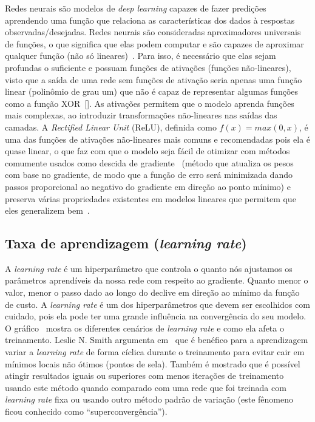 Redes neurais são modelos de \textit{deep learning} capazes de fazer predições aprendendo uma função que relaciona as características dos dados à respostas observadas/desejadas. Redes neurais são consideradas aproximadores universais de funções, o que significa que elas podem computar e são capazes de aproximar qualquer função (não só lineares)~\cite{dlbook}. Para isso, é necessário que elas sejam profundas o suficiente e possuam funções de ativações (funções não-lineares), visto que a saída de uma rede sem funções de ativação seria apenas uma função linear (polinômio de grau um) que não é capaz de representar algumas funções como a função \acrshort{XOR}~[]. As ativações permitem que o modelo aprenda funções mais complexas, ao introduzir transformações não-lineares nas saídas das camadas. A \textit{Rectified Linear Unit} (\acrshort{ReLU}), definida como $f(x) = max(0, x)$, é uma das funções de ativações não-lineares mais comuns e recomendadas pois ela é quase linear, o que faz com que o modelo seja fácil de otimizar com métodos comumente usados como descida de gradiente~\cite{rumelhart1988learning} (método que atualiza os pesos com base no gradiente, de modo que a função de erro será minimizada dando passos proporcional ao negativo do gradiente em direção ao ponto mínimo) e preserva várias propriedades existentes em modelos lineares que permitem que eles generalizem bem~\cite{deeplearning}.

\subsection{Taxa de aprendizagem (\textit{learning rate})}
A \textit{learning rate} é um hiperparâmetro que controla o quanto nós ajustamos os parâmetros aprendíveis da nossa rede com respeito ao gradiente. Quanto menor o valor, menor o passo dado ao longo do declive em direção ao mínimo da função de custo. A \textit{learning rate} é um dos hiperparâmetros que devem ser escolhidos com cuidado, pois ela pode ter uma grande influência na convergência do seu modelo. O gráfico~ mostra os diferentes cenários de \textit{learning rate} e como ela afeta o treinamento.
Leslie N. Smith argumenta em~\cite{smith2017cyclical} que é benéfico para a aprendizagem variar a \textit{learning rate} de forma cíclica durante o treinamento para evitar cair em mínimos locais não ótimos (pontos de sela). Também é mostrado que é possível atingir resultados iguais ou superiores com menos iterações de treinamento usando este método quando comparado com uma rede que foi treinada com \textit{learning rate} fixa ou usando outro método padrão de variação (este fênomeno ficou conhecido como ``superconvergência'').

